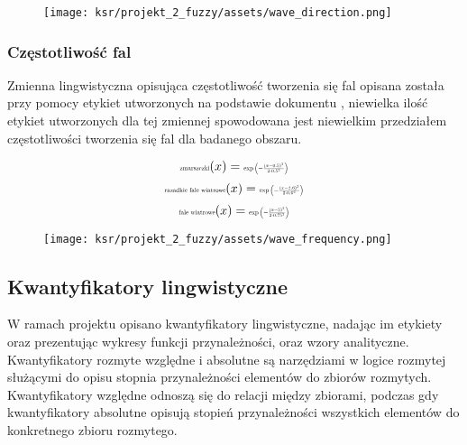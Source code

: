 \documentclass{article}
\begin{document}
\begin{figure}[H]
\centering
\texttt{[image: ksr/projekt\_2\_fuzzy/assets/wave\_direction.png]}
\label{fig:epsilon_bat}
\end{figure}

\subsubsection{Częstotliwość fal}

\noindent Zmienna lingwistyczna opisująca częstotliwość tworzenia się fal opisana została przy pomocy etykiet utworzonych na podstawie dokumentu \cite{waves}, niewielka ilość etykiet utworzonych dla tej zmiennej spowodowana jest niewielkim przedziałem częstotliwości tworzenia się fal dla badanego obszaru.

\begin{equation*}
\text{\scalebox{0.5}{zmarszczki}}(x) = \scalebox{0.5}{$\exp\left(-\frac{{(x - 0.5)^2}}{{2 \cdot 0.5^2}}\right)$}
\end{equation*}
\begin{equation*}
\text{\scalebox{0.5}{razadkie fale wiatrowe}}(x) = \scalebox{0.5}{$\exp\left(-\frac{{(x - 2.6)^2}}{{2 \cdot 0.6^2}}\right)$}
\end{equation*}
\begin{equation*}
\text{\scalebox{0.5}{fale wiatrowe}}(x) = \scalebox{0.5}{$\exp\left(-\frac{{(x - 5)^2}}{{2 \cdot 0.75^2}}\right)$}
\end{equation*}

\begin{figure}[H]
\centering
\texttt{[image: ksr/projekt\_2\_fuzzy/assets/wave\_frequency.png]}
\label{fig:epsilon_bat}
\end{figure}

\subsection{Kwantyfikatory lingwistyczne}

\noindent W ramach projektu opisano kwantyfikatory lingwistyczne, nadając im etykiety oraz prezentując wykresy funkcji przynależności, oraz wzory analityczne. Kwantyfikatory rozmyte względne i absolutne są narzędziami w logice rozmytej służącymi do opisu stopnia przynależności elementów do zbiorów rozmytych. Kwantyfikatory względne odnoszą się do relacji między zbiorami, podczas gdy kwantyfikatory absolutne opisują stopień przynależności wszystkich elementów do konkretnego zbioru rozmytego.\\
\end{document}
